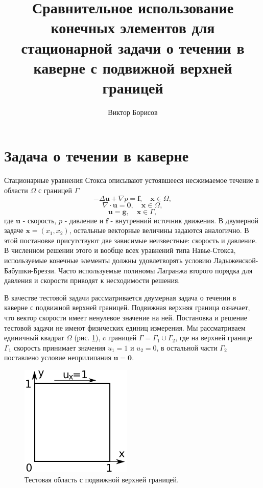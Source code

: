 \documentclass[12pt]{article}
\title{Сравнительное использование конечных элементов для стационарной задачи о течении в каверне с подвижной верхней границей}
\author{Виктор Борисов}
\begin{document}
\maketitle

\section{Задача о течении в каверне}
Стационарные уравнения Стокса описывают устоявшееся несжимаемое течение в области $\Omega$ с границей $\Gamma$
\begin{equation}
-\Delta {\bm u} + \nabla p = {\bm f}, \quad {\bm x} \in \Omega,
\end{equation}
\begin{equation}
\nabla\cdot{\bm u} = {\bm 0}, \quad {\bm x} \in \Omega,
\end{equation}
\begin{equation}
{\bm u} = {\bm g}, \quad {\bm x} \in \Gamma,
\end{equation}
где $\bm u$ - скорость, $p$ - давление и $\bm f$ - внутренний источник движения. В двумерной задаче ${\bm x}=(x_1, x_2)$, остальные векторные величины задаются аналогично.
В этой постановке присутствуют две зависимые неизвестные: скорость и давление.
В численном решении этого и вообще всех уравнений типа Навье-Стокса, используемые конечные элементы должны удовлетворять условию Ладыженской-Бабушки-Бреззи. Часто используемые полиномы Лагранжа второго порядка для давления и скорости приводят к несходимости решения.

В качестве тестовой задачи рассматривается двумерная задача о течении в каверне с подвижной верхней границей. Подвижная верхняя граница означает, что вектор скорости имеет ненулевое значение на ней. Постановка и решение тестовой задачи не имеют физических единиц измерения. Мы рассматриваем единичный квадрат $\Omega$ (рис. \ref{fg:cavity}), c границей $\Gamma=\Gamma_1 \cup \Gamma_2$, где на верхней границе $\Gamma_1$ скорость принимает значения $u_1=1$ и $u_2=0$, в остальной части $\Gamma_2$ поставлено условие неприлипания ${\bm u}={\bm 0}$.

\begin{figure}
	\begin{center}
		\includegraphics[width=200px]{pics/cavity400}
		\caption{Тестовая область с подвижной верхней границей.}
		\label{fg:cavity}
	\end{center}
\end{figure}
\end{document}
